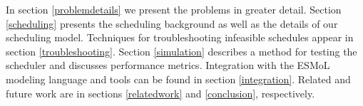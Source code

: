 



In section \ref{problemdetails} we present the problems in greater detail.  Section \ref{scheduling} presents the scheduling background as well as the details of our scheduling model.  Techniques for troubleshooting infeasible schedules appear in section \ref{troubleshooting}.  Section \ref{simulation} describes a method for testing the scheduler and discusses performance metrics.  Integration with the ESMoL modeling language and tools can be found in section \ref{integration}.  Related and future work are in sections \ref{relatedwork} and \ref{conclusion}, respectively.
